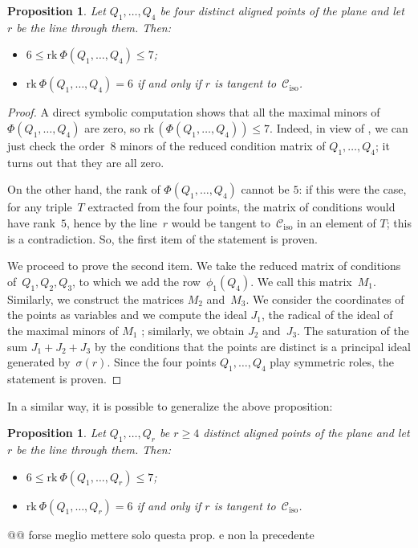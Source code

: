 \documentclass[11pt, a4paper, reqno, captions=tableheading,bibliography=totoc]{scrartcl}
\theoremstyle{plain}
\newtheorem{prop}[lemma]{Proposition}
\theoremstyle{definition}
\newcommand{\iso}{\mathcal{C}_{\mathrm{iso}}}
\newcommand{\rk}{\ensuremath{\mathrm{rk}}}
\begin{document}
\begin{prop}
\label{proposition:four_aligned}
Let $Q_1, \dotsc, Q_4$ be four distinct aligned points of the plane and
let $r$ be the line through them. Then:
\begin{itemize}
\item $6 \leq \rk  \ \Phi(Q_1, \dotsc, Q_4) \leq 7$;
\item $\rk  \ \Phi(Q_1, \dotsc, Q_4) = 6$ if and only if $r$ is tangent
to~$\iso$.
\end{itemize}
\end{prop}
\begin{proof}
  A direct symbolic computation shows that all the maximal minors of~$\Phi(Q_1, \dotsc, Q_4)$ are
  zero, so $\rk \,(\Phi(Q_1, \dotsc, Q_4)) \leq 7$.
  Indeed, in view of , we can just check the order~$8$ minors of the reduced condition matrix of $Q_1, \dotsc, Q_4$; it turns out that they are all zero.

  On the other hand, the rank of $\Phi(Q_1, \dotsc, Q_4)$ cannot be $5$:
  if this were the case, for any triple~$T$ extracted from the four points, the matrix of conditions would have rank~$5$, hence by  the line~$r$ would be tangent to~$\iso$ in an element of $T$; this is a contradiction.
  So, the first item of the statement is proven.

  We proceed to prove the second item.
  We take the reduced matrix of conditions of~$Q_1, Q_2, Q_3$, to which we add the row~$\phi_1(Q_4)$.
  We call this matrix~$M_1$.
  Similarly, we construct the matrices $M_2$ and~$M_3$.
  We consider the coordinates of the points as variables and we compute
  the ideal $J_1$, the radical of the ideal of the maximal minors of $M_1$ ; similarly, we obtain $J_2$ and~$J_3$.
  The saturation of the sum $J_1 + J_2 + J_3$ by the conditions that the points are distinct is a principal ideal generated by~$\sigma(r)$.
  Since the four points $Q_1, \dotsc, Q_4$ play symmetric roles, the statement is proven.
\end{proof}

In a similar way, it is possible to generalize the above proposition:
\begin{prop}
\label{proposition:n_aligned}
Let $Q_1, \dotsc, Q_r$ be $r\geq 4$ distinct aligned points of the plane and
let $r$ be the line through them. Then:
\begin{itemize}
\item $6 \leq \rk  \ \Phi(Q_1, \dotsc, Q_r) \leq 7$;
\item $\rk  \ \Phi(Q_1, \dotsc, Q_r) = 6$ if and only if $r$ is tangent
to~$\iso$.
\end{itemize}
\end{prop}
@@ forse meglio mettere solo questa prop. e non la precedente
\end{document}
